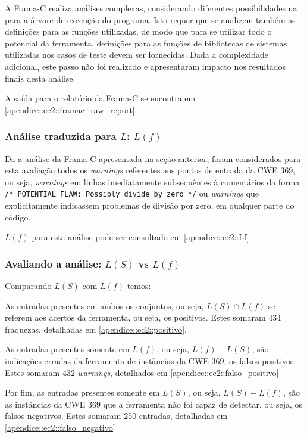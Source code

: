   A Frama-C realiza análises complexas, considerando diferentes possibilidades na para a árvore de execução do programa. Isto requer que se analizem também as definições para as funções utilizadas, de modo que para se utilizar todo o potencial da ferramenta, definições para as funções de bibliotecas de sistemas utilizadas nos casos de teste devem ser fornecidas. Dada a complexidade adicional, este passo não foi realizado e apresentaram impacto nos resultados finais desta análise.

  A saída para o relatório da Frama-C se encontra em \ref{apendice::ec2::framac_raw_report}.

  \subsubsection{Análise traduzida para $L$: $L(f)$}

  Da a análise da Frama-C apresentada na seção anterior, foram considerados para esta avaliação todos os \textit{warnings} referentes aos pontos de entrada da CWE 369, ou seja, \textit{warnings} em linhas imediatamente subsequêntes à comentários da forma
  \lstinline{/* POTENTIAL FLAW: Possibly divide by zero */}
  ou \textit{warnings} que explicitamente indicassem problemas de divisão por zero, em qualquer parte do código.

  $L(f)$ para esta análise pode ser consultado em \ref{apendice::ec2::Lf}.

  \subsubsection{Avaliando a análise: $L(S)$ vs $L(f)$}

  Comparando $L(S)$ com $L(f)$ temos:

  As entradas presentes em ambos os conjuntos, ou seja, $L(S) \cap L(f)$ se referem aos acertos da ferramenta, ou seja, os positivos. Estes somaram 434 fraquezas, detalhadas em \ref{apendice::ec2::positivo}.

  As entradas presentes somente em $L(f)$, ou seja, $L(f) - L(S)$, são indicações erradas da ferramenta de instâncias da CWE 369, os falsos positivos. Estes somaram 432 \textit{warnings}, detalhados em \ref{apendice::ec2::falso_positivo}

  Por fim, as entradas presentes somente em $L(S)$, ou seja, $L(S) - L(f)$, são as instâncias da CWE 369 que a ferramenta não foi capaz de detectar, ou seja, os falsos negativos. Estes somaram 250 entradas, detalhadas em \ref{apendice::ec2::falso_negativo}

